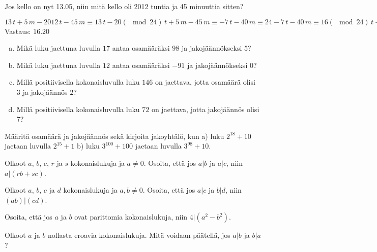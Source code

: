 \begin{tehtavasivu}
\begin{tehtava}
\end{tehtava}

\begin{tehtava}
    Jos kello on nyt 13.05, niin mitä kello oli 2012 tuntia ja 45 minuuttia sitten?
    \begin{vastaus}
        $13\, t + 5\, m - 2012\, t - 45\, m \equiv 13\, t - 20(\mod 24)\, t + 5\, m - 45\, m \equiv -7\, t -40\, m \equiv 24 -7\, t -40\, m \equiv 16(\mod 24)\, t + 20\, m $ \\
        Vastaus: $16.20$
    \end{vastaus}
\end{tehtava}

\begin{tehtava}
	\begin{enumerate}[a)]
	\item Mikä luku jaettuna luvulla $17$ antaa osamääräksi $98$ ja jakojäännökseksi $5$?
	\item Mikä luku jaettuna luvulla $12$ antaa osamääräksi $-91$ ja jakojäännökseksi $0$?
	\item Millä positiivisella kokonaisluvulla luku $146$ on jaettava, jotta osamäärä olisi $3$ ja jakojäännös $2$?
	\item Millä positiivisella kokonaisluvulla luku $72$ on jaettava, jotta jakojäännös olisi 7?
	\end{enumerate}
\end{tehtava}

\begin{tehtava}
	Määritä osamäärä ja jakojäännös sekä kirjoita jakoyhtälö, kun a) luku $2^{18} + 10$ jaetaan luvulla $2^{15} + 1$ b) luku $3^{100} + 100$ jaetaan luvulla $3^{98} + 10$.
\end{tehtava}

\begin{tehtava}
	Olkoot $a$, $b$, $c$, $r$ ja $s$ kokonaislukuja ja $a \neq 0$. Osoita, että jos $a|b$ ja $a|c$, niin $a|(rb + sc)$.
\end{tehtava}

\begin{tehtava}
	Olkoot $a$, $b$, $c$ ja $d$ kokonaislukuja ja $a, b \neq 0$. Osoita, että jos $a|c$ ja $b|d$, niin $(ab)|(cd)$.
\end{tehtava}

\begin{tehtava}
	Osoita, että jos $a$ ja $b$ ovat parittomia kokonaislukuja, niin $4 | (a^2 - b^2)$.
\end{tehtava}

\begin{tehtava}
	Olkoot $a$ ja $b$ nollasta eroavia kokonaislukuja. Mitä voidaan päätellä, jos $a|b$ ja $b|a$?
\end{tehtava}


\end{tehtavasivu}
